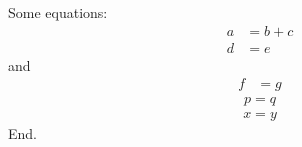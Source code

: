 \documentclass{article}
\begin{document}
Some equations:
\begin{align}
a &= b + c \\
d &= e
\end{align}
and
\begin{align*}
f &= g
\end{align*}
\begin{gather}
p = q
\end{gather}
\begin{multline}
x = y
\end{multline}
End.
\end{document}
